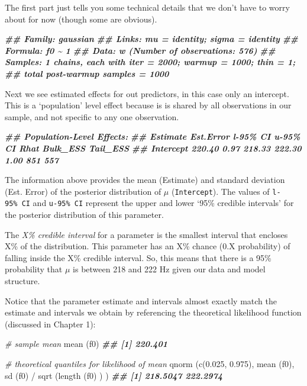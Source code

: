 \documentclass[
]{book}
\newenvironment{Shaded}{\begin{snugshade}}{\end{snugshade}}
\newcommand{\CommentTok}[1]{\textcolor[rgb]{0.56,0.35,0.01}{\textit{#1}}}
\newcommand{\DocumentationTok}[1]{\textcolor[rgb]{0.56,0.35,0.01}{\textbf{\textit{#1}}}}
\newcommand{\FloatTok}[1]{\textcolor[rgb]{0.00,0.00,0.81}{#1}}
\newcommand{\FunctionTok}[1]{\textcolor[rgb]{0.00,0.00,0.00}{#1}}
\newcommand{\NormalTok}[1]{#1}
\newcommand{\SpecialCharTok}[1]{\textcolor[rgb]{0.00,0.00,0.00}{#1}}
\begin{document}
The first part just tells you some technical details that we don't have to worry about for now (though some are obvious).

\begin{Shaded}
\begin{Highlighting}[]
\DocumentationTok{\#\#  Family: gaussian }
\DocumentationTok{\#\#   Links: mu = identity; sigma = identity }
\DocumentationTok{\#\# Formula: f0 \textasciitilde{} 1 }
\DocumentationTok{\#\#    Data: w (Number of observations: 576) }
\DocumentationTok{\#\# Samples: 1 chains, each with iter = 2000; warmup = 1000; thin = 1;}
\DocumentationTok{\#\#          total post{-}warmup samples = 1000}
\end{Highlighting}
\end{Shaded}

Next we see estimated effects for out predictors, in this case only an intercept. This is a `population' level effect because is is shared by all observations in our sample, and not specific to any one observation.

\begin{Shaded}
\begin{Highlighting}[]
\DocumentationTok{\#\# Population{-}Level Effects: }
\DocumentationTok{\#\#           Estimate Est.Error l{-}95\% CI u{-}95\% CI Rhat Bulk\_ESS Tail\_ESS}
\DocumentationTok{\#\# Intercept   220.40      0.97   218.33   222.30 1.00      851      557}
\end{Highlighting}
\end{Shaded}

The information above provides the mean (Estimate) and standard deviation (Est. Error) of the posterior distribution of \(\mu\) (\texttt{Intercept}). The values of \texttt{l-95\%\ CI} and \texttt{u-95\%\ CI} represent the upper and lower `95\% credible intervals' for the posterior distribution of this parameter.

The \emph{X\% credible interval} for a parameter is the smallest interval that encloses X\% of the distribution. This parameter has an X\% chance (0.X probability) of falling inside the X\% credible interval. So, this means that there is a 95\% probability that \(\mu\) is between 218 and 222 Hz given our data and model structure.

Notice that the parameter estimate and intervals almost exactly match the estimate and intervals we obtain by referencing the theoretical likelihood function (discussed in Chapter 1):

\begin{Shaded}
\begin{Highlighting}[]
\CommentTok{\# sample mean}
\FunctionTok{mean}\NormalTok{ (f0)}
\DocumentationTok{\#\# [1] 220.401}

\CommentTok{\# theoretical quantiles for likelihood of mean}
\FunctionTok{qnorm}\NormalTok{ (}\FunctionTok{c}\NormalTok{(}\FloatTok{0.025}\NormalTok{, }\FloatTok{0.975}\NormalTok{), }\FunctionTok{mean}\NormalTok{ (f0), }\FunctionTok{sd}\NormalTok{ (f0) }\SpecialCharTok{/} \FunctionTok{sqrt}\NormalTok{ (}\FunctionTok{length}\NormalTok{ (f0) ) )}
\DocumentationTok{\#\# [1] 218.5047 222.2974}
\end{Highlighting}
\end{Shaded}
\end{document}
